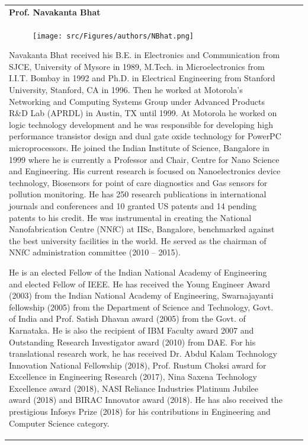 \newpage
{\tabcolsep=10pt
\renewcommand{\arraystretch}{1.7}
\begin{longtable}{V{2.5}p{.95\textwidth}V{2.5}}
\centerline{\large\bf Prof. Navakanta Bhat}\\[-.5cm]

\begin{figure}
\vspace{-10pt}

\texttt{[image: src/Figures/authors/NBhat.png]}

\vspace{-5pt}
\end{figure}
Navakanta Bhat received his B.E. in Electronics and Communication from SJCE, University of Mysore in 1989, M.Tech. in Microelectronics from I.I.T. Bombay in 1992 and Ph.D. in Electrical Engineering from Stanford University, Stanford, CA in 1996. Then he worked at Motorola’s Networking and Computing Systems Group under Advanced Products R\&D Lab (APRDL)  in Austin, TX until 1999. At Motorola he worked on logic technology development and he was responsible for developing high performance transistor design and dual gate oxide technology for PowerPC microprocessors. He joined the Indian Institute of Science, Bangalore in 1999 where he is currently a Professor and Chair, Centre for Nano Science and Engineering. His current research is focused on Nanoelectronics device technology, Biosensors for point of care diagnostics and Gas sensors for pollution monitoring. He has 250 research publications in international journals and conferences and 10 granted US patents and 14 pending patents to his credit. He was instrumental in creating the National Nanofabrication Centre (NNfC) at IISc, Bangalore, benchmarked against the best university facilities in the world. He served as the chairman of NNfC administration committee (2010 – 2015).

\bigskip

He is an elected Fellow of the Indian National Academy of Engineering and elected Fellow of IEEE. He has received the Young Engineer Award (2003) from the Indian National Academy of Engineering, Swarnajayanti fellowship (2005) from the Department of Science and Technology, Govt. of India and Prof. Satish Dhavan award (2005) from the Govt. of Karnataka. He is also the recipient of IBM Faculty award 2007 and Outstanding Research Investigator award (2010) from DAE. For his translational research work, he has received Dr. Abdul Kalam Technology Innovation National Fellowship (2018), Prof. Rustum Choksi award for Excellence in Engineering Research (2017), Nina Saxena Technology Excellence award (2018), NASI Reliance Industries Platinum Jubilee award (2018) and BIRAC Innovator award (2018). He has also received the prestigious Infosys Prize (2018) for his contributions in Engineering and Computer Science category. 


\end{longtable}}

